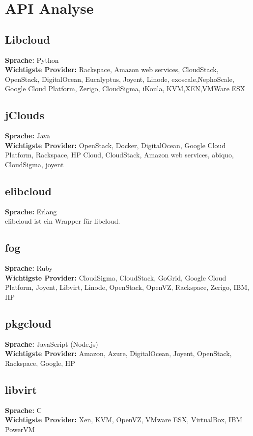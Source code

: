 \section{API Analyse}
\subsection{Libcloud\autocite{libcloud}}
\textbf{Sprache: }Python\\
\textbf{Wichtigste Provider: }Rackspace, Amazon web services, CloudStack, OpenStack, DigitalOcean, 
Eucalyptus, Joyent, Linode, exoscale,NephoScale, Google Cloud Platform, Zerigo, CloudSigma, iKoula, 
KVM,XEN,VMWare ESX

\subsection{jClouds\autocite{jclouds}}
\textbf{Sprache: }Java\\
\textbf{Wichtigste Provider: }OpenStack, Docker, DigitalOcean, Google Cloud Platform, 
Rackspace, HP Cloud, CloudStack, Amazon web services, abiquo, CloudSigma, joyent
\subsection{elibcloud\autocite{elibcloud}}
\textbf{Sprache: }Erlang\\
elibcloud ist ein Wrapper für libcloud.
\subsection{fog\autocite{fog}}
\textbf{Sprache: }Ruby\\
\textbf{Wichtigste Provider: }CloudSigma, CloudStack, GoGrid, Google Cloud Platform, Joyent, 
Libvirt, Linode, OpenStack, OpenVZ, Rackspace, Zerigo, IBM, HP

\subsection{pkgcloud\autocite{pkgcloud}}
\textbf{Sprache: }JavaScript (Node.js)\\
\textbf{Wichtigste Provider: }Amazon, Azure, DigitalOcean, Joyent, OpenStack, Rackspace, Google, HP

\subsection{libvirt\autocite{libvirt}}
\textbf{Sprache: }C\\
\textbf{Wichtigste Provider: }Xen, KVM, OpenVZ, VMware ESX, VirtualBox, IBM PowerVM

